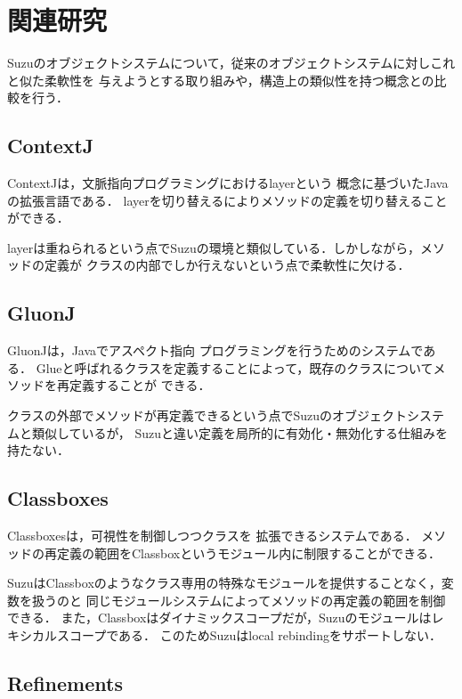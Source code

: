 \documentclass{ipsjprosym}
\begin{document}
\section{関連研究}

Suzuのオブジェクトシステムについて，従来のオブジェクトシステムに対しこれと似た柔軟性を
与えようとする取り組みや，構造上の類似性を持つ概念との比較を行う．

\subsection{ContextJ}

ContextJ\cite{AppeltauerMalte:2011}は，文脈指向プログラミングにおけるlayerという
概念に基づいたJavaの拡張言語である．
layerを切り替えるによりメソッドの定義を切り替えることができる．

layerは重ねられるという点でSuzuの環境と類似している．しかしながら，メソッドの定義が
クラスの内部でしか行えないという点で柔軟性に欠ける．

\subsection{GluonJ}

GluonJ\cite{Chiba:2010:MMC:1869459.1869503}は，Javaでアスペクト指向
プログラミングを行うためのシステムである．
Glueと呼ばれるクラスを定義することによって，既存のクラスについてメソッドを再定義することが
できる．

クラスの外部でメソッドが再定義できるという点でSuzuのオブジェクトシステムと類似しているが，
Suzuと違い定義を局所的に有効化・無効化する仕組みを持たない．

\subsection{Classboxes}

Classboxes\cite{Bergel:2005:CCV:1646591.1646599}は，可視性を制御しつつクラスを
拡張できるシステムである．
メソッドの再定義の範囲をClassboxというモジュール内に制限することができる．

SuzuはClassboxのようなクラス専用の特殊なモジュールを提供することなく，変数を扱うのと
同じモジュールシステムによってメソッドの再定義の範囲を制御できる．
また，Classboxはダイナミックスコープだが，Suzuのモジュールはレキシカルスコープである．
このためSuzuはlocal rebindingをサポートしない．

\subsection{Refinements}
\end{document}
